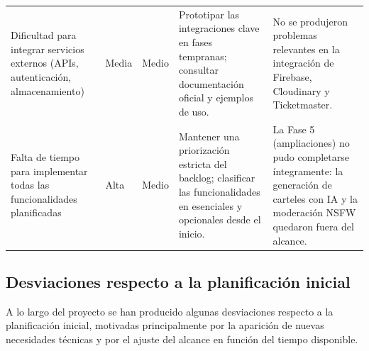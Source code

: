 \begin{longtable}{
>{\raggedright\arraybackslash}p{3.5cm}
>{\raggedright\arraybackslash}p{1.5cm}
>{\raggedright\arraybackslash}p{1.5cm}
>{\raggedright\arraybackslash}p{4.5cm}
>{\raggedright\arraybackslash}p{3.5cm}}
Dificultad para integrar servicios externos (APIs, autenticación, almacenamiento) &
Media & Medio &
Prototipar las integraciones clave en fases tempranas; consultar documentación oficial y ejemplos de uso. &
No se produjeron problemas relevantes en la integración de Firebase, Cloudinary y Ticketmaster. \\

Falta de tiempo para implementar todas las funcionalidades planificadas &
Alta & Medio &
Mantener una priorización estricta del backlog; clasificar las funcionalidades en esenciales y opcionales desde el inicio. &
La Fase 5 (ampliaciones) no pudo completarse íntegramente: la generación de carteles con IA y la moderación NSFW quedaron fuera del alcance. \\

\end{longtable}

\subsection{Desviaciones respecto a la planificación inicial}\label{sec:desviaciones}

A lo largo del proyecto se han producido algunas desviaciones respecto a la planificación inicial, motivadas principalmente por la aparición de nuevas necesidades técnicas y por el ajuste del alcance en función del tiempo disponible.

